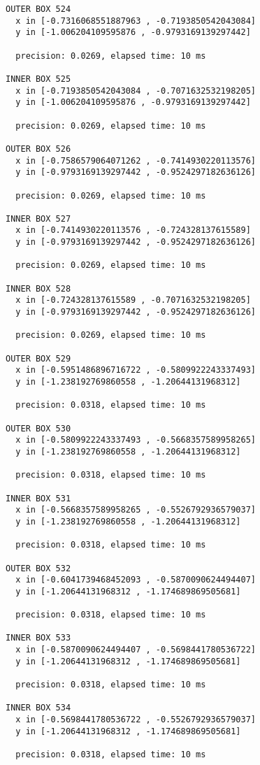 \begin{verbatim}
OUTER BOX 524
  x in [-0.7316068551887963 , -0.7193850542043084]
  y in [-1.006204109595876 , -0.9793169139297442]

  precision: 0.0269, elapsed time: 10 ms

INNER BOX 525
  x in [-0.7193850542043084 , -0.7071632532198205]
  y in [-1.006204109595876 , -0.9793169139297442]

  precision: 0.0269, elapsed time: 10 ms

OUTER BOX 526
  x in [-0.7586579064071262 , -0.7414930220113576]
  y in [-0.9793169139297442 , -0.9524297182636126]

  precision: 0.0269, elapsed time: 10 ms

INNER BOX 527
  x in [-0.7414930220113576 , -0.724328137615589]
  y in [-0.9793169139297442 , -0.9524297182636126]

  precision: 0.0269, elapsed time: 10 ms

INNER BOX 528
  x in [-0.724328137615589 , -0.7071632532198205]
  y in [-0.9793169139297442 , -0.9524297182636126]

  precision: 0.0269, elapsed time: 10 ms

OUTER BOX 529
  x in [-0.5951486896716722 , -0.5809922243337493]
  y in [-1.238192769860558 , -1.20644131968312]

  precision: 0.0318, elapsed time: 10 ms

OUTER BOX 530
  x in [-0.5809922243337493 , -0.5668357589958265]
  y in [-1.238192769860558 , -1.20644131968312]

  precision: 0.0318, elapsed time: 10 ms

INNER BOX 531
  x in [-0.5668357589958265 , -0.5526792936579037]
  y in [-1.238192769860558 , -1.20644131968312]

  precision: 0.0318, elapsed time: 10 ms

OUTER BOX 532
  x in [-0.6041739468452093 , -0.5870090624494407]
  y in [-1.20644131968312 , -1.174689869505681]

  precision: 0.0318, elapsed time: 10 ms

INNER BOX 533
  x in [-0.5870090624494407 , -0.5698441780536722]
  y in [-1.20644131968312 , -1.174689869505681]

  precision: 0.0318, elapsed time: 10 ms

INNER BOX 534
  x in [-0.5698441780536722 , -0.5526792936579037]
  y in [-1.20644131968312 , -1.174689869505681]

  precision: 0.0318, elapsed time: 10 ms


\end{verbatim}
